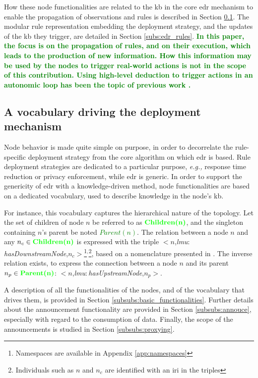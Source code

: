 \documentclass{iosart2c}
\newcommand{\added}[1]{\textcolor{green}{\textbf{#1}}}
\newcommand{\namespace}[1]{\textit{#1$:$}}
\newcommand{\concept}[2]{\namespace{#1}\-\textit{#2}}
\newcommand{\triplet}[3]{$<$#1,\textit{#2},#3$>$}
\begin{document}
How these node functionalities are related to the \gls{kb} in the core \gls{edr} mechanism to enable the propagation of observations and rules is described in Section \textsection \ref{subs:edr_vocabulary}.
The modular rule representation embedding the deployment strategy, and the updates of the \gls{kb} they trigger, are detailed in Section \textsection \ref{subs:edr_rules}.
\added{In this paper, the focus is on the propagation of rules, and on their execution, which leads to the production of new information. 
How this information may be used by the nodes to trigger real-world actions is not in the scope of this contribution. 
Using high-level deduction to trigger actions in an autonomic loop has been the topic of previous work \cite{Seydoux2016}.}

\subsection{A vocabulary driving the deployment mechanism}
\label{subs:edr_vocabulary}

Node behavior is made quite simple on purpose, in order to decorrelate the rule-specific deployment strategy from the core algorithm on which \gls{edr} is based.
Rule deployment strategies are dedicated to a particular purpose, \textit{e.g.,} response time reduction or privacy enforcement, while \gls{edr} is generic.
In order to support the genericity of \gls{edr} with a knowledge-driven method, node functionalities are based on a dedicated vocabulary, used to describe knowledge in the node's \gls{kb}.

For instance, this vocabulary captures the hierarchical nature of the topology.
Let the set of children of node $n$ be referred to as $\added{Children(n)}$, and the singleton containing $n$'s parent be noted \added{$Parent(n)$}.
The relation between a node $n$ and any $n_c\in \added{Children(n)}$ is expressed with the triple \triplet{$n$}{\concept{lmu}{has\-Downstream\-Node}}{$n_c$}\footnote{Namespaces are available in Appendix \ref{app:namespaces}}$^,$\footnote{Individuals such as $n$ and $n_c$ are identified with an \gls{iri} in the triples}, based on a nomenclature presented in \cite{Seydoux2017}. 
The inverse relation exists, to express the connection between a node $n$ and its parent $n_p\in \added{Parent(n)}$: \triplet{$n$}{\concept{lmu}{has\-Upstream\-Node}}{$n_p$}.

A description of all the functionalities of the nodes, and of the vocabulary that drives them, is provided in Section \textsection \ref{subsubs:basic_functionalities}. 
Further details about the announcement functionality are provided in Section \textsection \ref{subsubs:annouce}, especially with regard to the consumption of data.
Finally, the scope of the announcements is studied in Section \textsection \ref{subsubs:proxying}.
\end{document}
